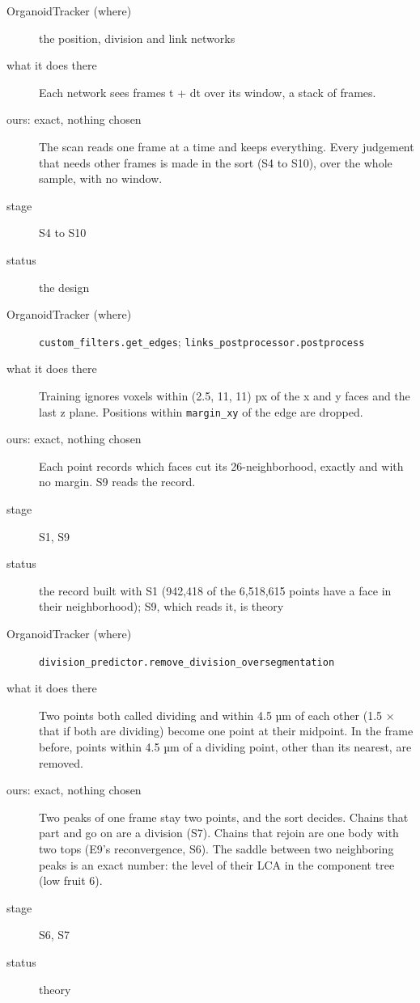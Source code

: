 \begin{description}
\item[{OrganoidTracker (where)}] the position, division and link networks
\item[{what it does there}] Each network sees frames t + dt over its window, a stack of frames.
\item[{ours: exact, nothing chosen}] The scan reads one frame at a time and keeps everything. Every judgement that needs other frames is made in the sort (S4 to S10), over the whole sample, with no window.
\item[{stage}] S4 to S10
\item[{status}] the design
\end{description}

\begin{description}
\item[{OrganoidTracker (where)}] \texttt{custom\_\allowbreak{}filters.\allowbreak{}get\_\allowbreak{}edges}; \texttt{links\_\allowbreak{}postprocessor.\allowbreak{}postprocess}
\item[{what it does there}] Training ignores voxels within (2.5, 11, 11) px of the x and y faces and the last z plane. Positions within \texttt{margin\_\allowbreak{}xy} of the edge are dropped.
\item[{ours: exact, nothing chosen}] Each point records which faces cut its 26-neighborhood, exactly and with no margin. S9 reads the record.
\item[{stage}] S1, S9
\item[{status}] the record built with S1 (942,418 of the 6,518,615 points have a face in their neighborhood); S9, which reads it, is theory
\end{description}

\begin{description}
\item[{OrganoidTracker (where)}] \texttt{division\_\allowbreak{}predictor.\allowbreak{}remove\_\allowbreak{}division\_\allowbreak{}oversegmentation}
\item[{what it does there}] Two points both called dividing and within 4.5 µm of each other (1.5 × that if both are dividing) become one point at their midpoint. In the frame before, points within 4.5 µm of a dividing point, other than its nearest, are removed.
\item[{ours: exact, nothing chosen}] Two peaks of one frame stay two points, and the sort decides. Chains that part and go on are a division (S7). Chains that rejoin are one body with two tops (E9's reconvergence, S6). The saddle between two neighboring peaks is an exact number: the level of their LCA in the component tree (low fruit 6).
\item[{stage}] S6, S7
\item[{status}] theory
\end{description}

